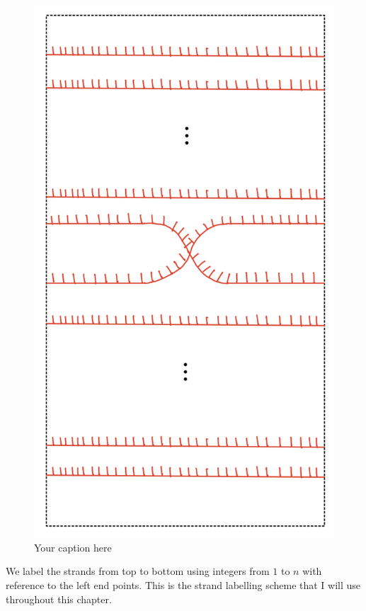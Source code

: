 \begin{figure}[H] 
    \centering
    \includegraphics[scale = 0.95]{diagrams/natural_alternating_diagrams/8.png} 
    \caption{Your caption here}
    \label{fig:your-label}
\end{figure}


We label the strands from top to bottom using integers from $1$ to $n$ with reference to the left end points. This is the strand labelling scheme that I will use throughout this chapter.


